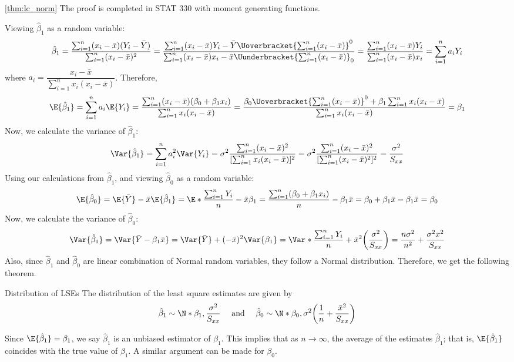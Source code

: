 \begin{Proof}{\ref{thm:lc_norm}}{}
  The proof is completed in STAT 330 with moment generating functions.
\end{Proof}
Viewing $ \hat{\beta}_1 $ as a random variable:
\[ \hat{\beta}_1=\frac{\sum_{i=1}^{n} (x_i-\bar{x})
    (Y_i-\bar{Y})}{
    \sum_{i=1}^{n} (x_i-\bar{x})^2
  }
  =
  \frac{\sum_{i=1}^{n} (x_i-\bar{x})Y_i-
    \bar{Y}\Uoverbracket{\sum_{i=1}^{n} (x_i-\bar{x})}^{0}}{
    \sum_{i=1}^{n} (x_i-\bar{x})x_i-\bar{x}
    \Uunderbracket{\sum_{i=1}^{n} (x_i-\bar{x})}_{0}
  }
  =
  \frac{\sum_{i=1}^{n} (x_i-\bar{x})Y_i}{
    \sum_{i=1}^{n} (x_i-\bar{x})x_i
  }=\sum_{i=1}^{n} a_i Y_i  \]
where $ a_i=\dfrac{x_i-\bar{x}}{\sum_{i=1}^{n} x_i(x_i-\bar{x})}  $.
Therefore,
\[
  \E{\hat{\beta}_1}
  = \sum_{i=1}^{n} a_i\E{Y_i}
  =\frac{\sum_{i=1}^{n}(x_i-\bar{x})(\beta_0+\beta_1x_i)}{
    \sum_{i=1}^{n} x_i(x_i-\bar{x})
  }
  =\frac{\beta_0 \Uoverbracket{\sum_{i=1}^{n}(x_i-\bar{x})}^{0}+
    \beta_1\sum_{i=1}^{n} x_i(x_i-\bar{x})}{
    \sum_{i=1}^{n} x_i(x_i-\bar{x})
  }
  =
  \beta_1
\]
Now, we calculate the variance of $ \hat{\beta}_1 $:
\[
  \Var{\hat{\beta}_1}
  =\sum_{i=1}^{n} a_i^2\Var{Y_i}
  =\sigma^2
  \frac{\sum_{i=1}^{n} (x_i-\bar{x})^2}{
    [\sum_{i=1}^{n} x_i(x_i-\bar{x})]^2
  }
  =\sigma^2 \frac{\sum_{i=1}^{n} (x_i-\bar{x})^2}{
    [\sum_{i=1}^{n} (x_i-\bar{x})^2]^2
  }
  =\frac{\sigma^2}{S_{xx}}
\]
Using our calculations from $ \hat{\beta}_1 $,
and viewing $ \hat{\beta}_0 $ as a random variable:
\[ \E{\hat{\beta}_0}=
  \E{\bar{Y}}-\bar{x}\E{\hat{\beta}_1}=
  \E*{\frac{\sum_{i=1}^{n}Y_i}{n}}-\bar{x}\beta_1=
  \frac{\sum_{i=1}^{n}(\beta_0+\beta_1x_i)}{n}-
  \beta_1\bar{x}=\beta_0+\beta_1\bar{x}-\beta_1\bar{x}=\beta_0
\]
Now, we calculate the variance of $ \hat{\beta}_0 $:
\[
  \Var{\hat{\beta}_1}
  =\Var{\bar{Y}-\beta_1\bar{x}}
  =\Var{\bar{Y}}+(-\bar{x})^2\Var{\beta_1}
  =\Var*{\frac{\sum_{i=1}^{n} Y_i}{n}}+\bar{x}^2\biggl( \frac{\sigma^2}{S_{xx}} \biggr)
  =\frac{n\sigma^2}{n^2}+\frac{\sigma^2 x^2}{S_{xx}}
\]
Also, since $ \hat{\beta}_1 $ and $ \hat{\beta}_0 $
are linear combination of Normal random variables,
they follow a Normal distribution. Therefore, we get the following theorem.
\begin{Theorem}{Distribution of LSEs}{}
  The distribution of the least square estimates are given by
  \[ \hat{\beta}_1\sim
    \N*{\beta_1,\frac{\sigma^2}{S_{xx}}}\quad\text{ and }\quad
    \hat{\beta}_0
    \sim \N*{\beta_0,\sigma^2
      \biggl(\frac{1}{n}+\frac{\bar{x}^2}{S_{xx}}\biggr)} \]
\end{Theorem}
Since $ \E{\hat{\beta}_1}=\beta_1 $,
we say $ \hat{\beta}_1 $ is an unbiased
estimator of $ \beta_1 $. This implies
that as $ n\to\infty $, the average
of the estimates $ \hat{\beta}_1 $; that is,
$ \E{\hat{\beta}_1} $ coincides with the true
value of $ \beta_1 $. A similar argument can be made for $ \beta_0 $.

